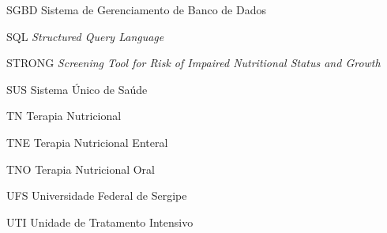 \begin{siglas}
\item[SGBD]{Sistema de Gerenciamento de Banco de Dados}
\item[SQL]{\textit{Structured Query Language}}
\item[STRONG]{\textit{Screening Tool for Risk of Impaired Nutritional Status and Growth}}
\item[SUS]{Sistema Único de Saúde}
\item[TN]{Terapia Nutricional}
\item[TNE]{Terapia Nutricional Enteral}
\item[TNO]{Terapia Nutricional Oral}
\item[UFS]{Universidade Federal de Sergipe}
\item[UTI]{Unidade de Tratamento Intensivo}
\end{siglas}